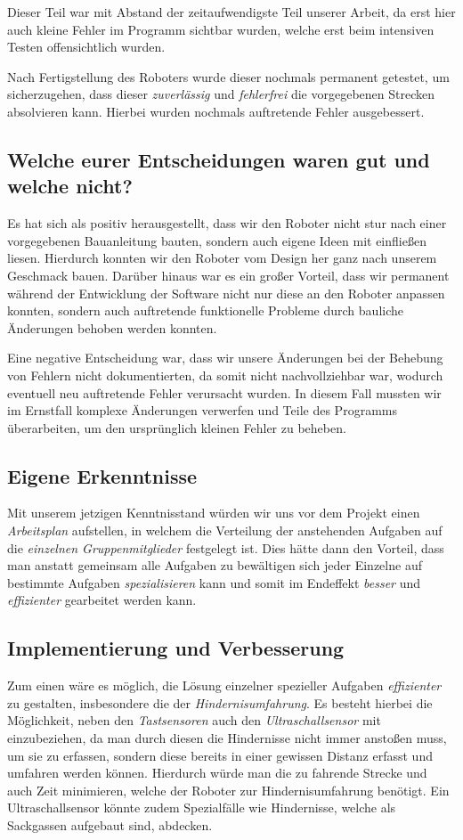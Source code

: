 \documentclass[a4paper]{article}
\begin{document}
Dieser Teil war mit Abstand der zeitaufwendigste Teil unserer Arbeit,
da erst hier auch kleine Fehler im Programm sichtbar wurden, welche
erst beim intensiven Testen offensichtlich wurden.

Nach Fertigstellung des Roboters wurde dieser nochmals permanent
getestet, um sicherzugehen, dass dieser \emph{zuverlässig} und
\emph{fehlerfrei} die vorgegebenen Strecken absolvieren kann. Hierbei
wurden nochmals auftretende Fehler ausgebessert.

\subsection{Welche eurer Entscheidungen waren gut und welche nicht?}

Es hat sich als positiv herausgestellt, dass wir den Roboter nicht
stur nach einer vorgegebenen Bauanleitung bauten, sondern auch eigene
Ideen mit einfließen liesen. Hierdurch konnten wir den Roboter vom
Design her ganz nach unserem Geschmack bauen. Darüber hinaus war es
ein großer Vorteil, dass wir permanent während der Entwicklung der
Software nicht nur diese an den Roboter anpassen konnten, sondern auch
auftretende funktionelle Probleme durch bauliche Änderungen behoben
werden konnten.

Eine negative Entscheidung war, dass wir unsere Änderungen bei der
Behebung von Fehlern nicht dokumentierten, da somit nicht
nachvollziehbar war, wodurch eventuell neu auftretende Fehler
verursacht wurden. In diesem Fall mussten wir im Ernstfall komplexe
Änderungen verwerfen und Teile des Programms überarbeiten, um den
ursprünglich kleinen Fehler zu beheben.

\subsection{Eigene Erkenntnisse}

Mit unserem jetzigen Kenntnisstand würden wir uns vor dem Projekt
einen \emph{Arbeitsplan} aufstellen, in welchem die Verteilung der
anstehenden Aufgaben auf die \emph{einzelnen Gruppenmitglieder}
festgelegt ist. Dies hätte dann den Vorteil, dass man anstatt
gemeinsam alle Aufgaben zu bewältigen sich jeder Einzelne auf
bestimmte Aufgaben \emph{spezialisieren} kann und somit im Endeffekt
\emph{besser} und \emph{effizienter} gearbeitet werden kann.

\subsection{Implementierung und Verbesserung}
Zum einen wäre es möglich, die Lösung einzelner spezieller Aufgaben
\emph{effizienter} zu gestalten, insbesondere die der
\emph{Hindernisumfahrung}. Es besteht hierbei die Möglichkeit, neben
den \emph{Tastsensoren} auch den \emph{Ultraschallsensor} mit
einzubeziehen, da man durch diesen die Hindernisse nicht immer
anstoßen muss, um sie zu erfassen, sondern diese bereits in einer
gewissen Distanz erfasst und umfahren werden können. Hierdurch würde
man die zu fahrende Strecke und auch Zeit minimieren, welche
der Roboter zur Hindernisumfahrung benötigt. Ein Ultraschallsensor
könnte zudem Spezialfälle wie Hindernisse, welche als Sackgassen
aufgebaut sind, abdecken.
\end{document}
